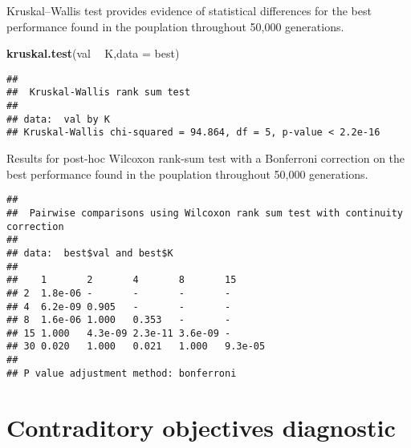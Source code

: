 \documentclass[]{book}
\newenvironment{Shaded}{\begin{snugshade}}{\end{snugshade}}
\newcommand{\DataTypeTok}[1]{\textcolor[rgb]{0.13,0.29,0.53}{#1}}
\newcommand{\KeywordTok}[1]{\textcolor[rgb]{0.13,0.29,0.53}{\textbf{#1}}}
\newcommand{\NormalTok}[1]{#1}
\newcommand{\OperatorTok}[1]{\textcolor[rgb]{0.81,0.36,0.00}{\textbf{#1}}}
\newcommand{\OtherTok}[1]{\textcolor[rgb]{0.56,0.35,0.01}{#1}}
\newcommand{\StringTok}[1]{\textcolor[rgb]{0.31,0.60,0.02}{#1}}
\begin{document}
Kruskal--Wallis test provides evidence of statistical differences for the best performance found in the pouplation throughout 50,000 generations.

\begin{Shaded}
\begin{Highlighting}[]
\KeywordTok{kruskal.test}\NormalTok{(val }\OperatorTok{~}\StringTok{ }\NormalTok{K,}\DataTypeTok{data =}\NormalTok{ best)}
\end{Highlighting}
\end{Shaded}

\begin{verbatim}
## 
##  Kruskal-Wallis rank sum test
## 
## data:  val by K
## Kruskal-Wallis chi-squared = 94.864, df = 5, p-value < 2.2e-16
\end{verbatim}

Results for post-hoc Wilcoxon rank-sum test with a Bonferroni correction on the best performance found in the pouplation throughout 50,000 generations.

\begin{Shaded}
\end{Shaded}

\begin{verbatim}
## 
##  Pairwise comparisons using Wilcoxon rank sum test with continuity correction 
## 
## data:  best$val and best$K 
## 
##    1       2       4       8       15     
## 2  1.8e-06 -       -       -       -      
## 4  6.2e-09 0.905   -       -       -      
## 8  1.6e-06 1.000   0.353   -       -      
## 15 1.000   4.3e-09 2.3e-11 3.6e-09 -      
## 30 0.020   1.000   0.021   1.000   9.3e-05
## 
## P value adjustment method: bonferroni
\end{verbatim}

\hypertarget{contraditory-objectives-diagnostic-4}{%
\section{Contraditory objectives diagnostic}\label{contraditory-objectives-diagnostic-4}}
\end{document}
